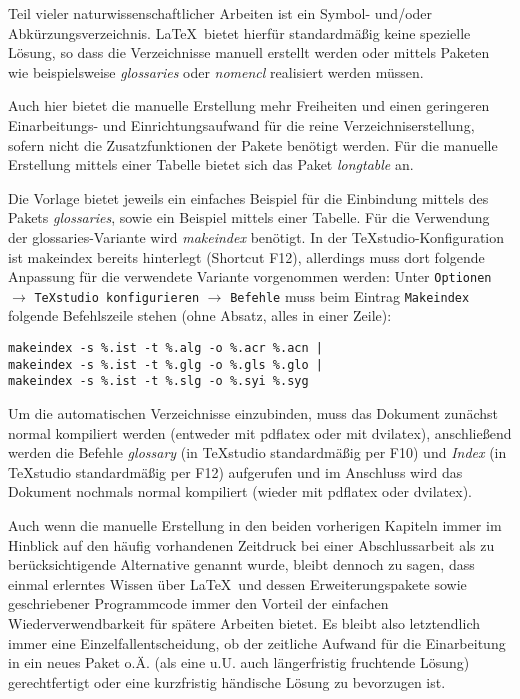 Teil vieler naturwissenschaftlicher Arbeiten ist ein Symbol- und/oder Abkürzungsverzeichnis. \LaTeX\ bietet hierfür standardmäßig keine spezielle Lösung, so dass die Verzeichnisse manuell erstellt werden oder mittels Paketen wie beispielsweise \textit{glossaries} oder \textit{nomencl} realisiert werden müssen.

Auch hier bietet die manuelle Erstellung mehr Freiheiten und einen geringeren Einarbeitungs- und Einrichtungsaufwand für die reine Verzeichniserstellung, sofern nicht die Zusatzfunktionen der Pakete benötigt werden. Für die manuelle Erstellung mittels einer Tabelle bietet sich das Paket \emph{longtable} an.

Die Vorlage bietet jeweils ein einfaches Beispiel für die Einbindung mittels des Pakets \emph{glossaries}, sowie ein Beispiel mittels einer Tabelle. Für die Verwendung der glossaries-Variante wird \textit{makeindex} benötigt. In der TeXstudio-Konfiguration ist makeindex bereits hinterlegt (Shortcut F12), allerdings muss dort folgende Anpassung für die verwendete Variante vorgenommen werden:\newline
Unter \verb|Optionen| $\rightarrow$ \verb|TeXstudio konfigurieren| $\rightarrow$ \verb|Befehle| muss beim Eintrag \verb|Makeindex| folgende Befehlszeile stehen (ohne Absatz, alles in einer Zeile): 
\begin{verbatim}
makeindex -s %.ist -t %.alg -o %.acr %.acn | 
makeindex -s %.ist -t %.glg -o %.gls %.glo | 
makeindex -s %.ist -t %.slg -o %.syi %.syg
\end{verbatim}

Um die automatischen Verzeichnisse einzubinden, muss das Dokument zunächst normal kompiliert werden (entweder mit pdflatex oder mit dvilatex), anschließend werden die Befehle \emph{glossary} (in TeXstudio standardmäßig per F10) und \emph{Index} (in TeXstudio standardmäßig per F12) aufgerufen und im Anschluss wird das Dokument nochmals normal kompiliert (wieder mit pdflatex oder dvilatex).

Auch wenn die manuelle Erstellung in den beiden vorherigen Kapiteln immer im Hinblick auf den häufig vorhandenen Zeitdruck bei einer Abschlussarbeit als zu berücksichtigende Alternative genannt wurde, bleibt dennoch zu sagen, dass einmal erlerntes Wissen über \LaTeX\ und dessen Erweiterungspakete sowie geschriebener Programmcode immer den Vorteil der einfachen Wiederverwendbarkeit für spätere Arbeiten bietet. Es bleibt also letztendlich immer eine Einzelfallentscheidung, ob der zeitliche Aufwand für die Einarbeitung in ein neues Paket o.Ä. (als eine u.U. auch längerfristig fruchtende Lösung) gerechtfertigt oder eine kurzfristig händische Lösung zu bevorzugen ist.